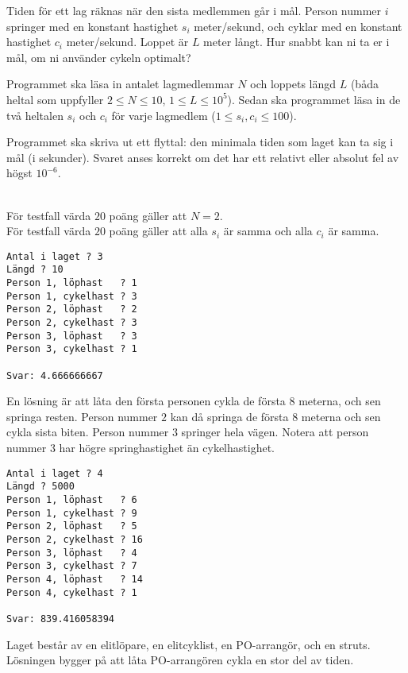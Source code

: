 Tiden för ett lag räknas när den sista medlemmen går i mål. Person nummer $i$ springer med en
konstant hastighet $s_i$ meter/sekund, och cyklar med en konstant hastighet $c_i$ meter/sekund. Loppet är $L$ meter långt.
Hur snabbt kan ni ta er i mål, om ni använder cykeln optimalt?

Programmet ska läsa in antalet lagmedlemmar $N$ och loppets längd $L$ (båda heltal som uppfyller $2 \leq N \leq 10$, $1 \leq L \leq 10^5$). Sedan ska programmet läsa in de två heltalen $s_i$ och $c_i$ för varje lagmedlem ($1 \leq s_i, c_i \leq 100$).

Programmet ska skriva ut ett flyttal: den minimala tiden som laget kan ta sig i mål (i sekunder).
Svaret anses korrekt om det har ett relativt eller absolut fel av högst $10^{-6}$.

\\
För testfall värda $20$ poäng gäller att $N=2$. \\
För testfall värda $20$ poäng gäller att alla $s_i$ är samma och alla $c_i$ är samma.\\

\begin{multicols}{2}
\begin{verbatim}
Antal i laget ? 3
Längd ? 10
Person 1, löphast   ? 1
Person 1, cykelhast ? 3
Person 2, löphast   ? 2
Person 2, cykelhast ? 3
Person 3, löphast   ? 3
Person 3, cykelhast ? 1

Svar: 4.666666667
\end{verbatim}
 En lösning är att låta den första personen cykla de första $8$ meterna, och sen springa resten. Person nummer $2$
kan då springa de första $8$ meterna och sen cykla sista biten. Person nummer $3$ springer hela vägen. Notera att person nummer $3$ har
högre springhastighet än cykelhastighet.
\vfill\columnbreak
{}
\begin{verbatim}
Antal i laget ? 4
Längd ? 5000
Person 1, löphast   ? 6
Person 1, cykelhast ? 9
Person 2, löphast   ? 5
Person 2, cykelhast ? 16
Person 3, löphast   ? 4
Person 3, cykelhast ? 7
Person 4, löphast   ? 14
Person 4, cykelhast ? 1

Svar: 839.416058394
\end{verbatim}
 Laget består av en elitlöpare, en elitcyklist, en PO-arrangör, och en struts. Lösningen bygger på att låta PO-arrangören
cykla en stor del av tiden.
\vfill
\end{multicols}




